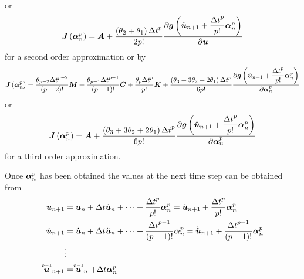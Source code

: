 or
\begin{equation}
  \fnof{\matr{J}}{\vectr{\alpha}^{p}_{n}}=\matr{A}+\dfrac{\pbrac{\theta_{2}+\theta_{1}}{\Delta
      t}^{p}}{2p!}
  \delby{\fnof{\vectr{g}}{\hat{\vectr{u}}_{n+1}+\dfrac{{\Delta t}^{p}}{p!}\vectr{\alpha}^{p}_{n}}}{\vectr{u}}
\end{equation}
for a second order approximation or by
\begin{equation}
  \fnof{\matr{J}}{\vectr{\alpha}^{p}_{n}}=\dfrac{\theta_{p-2}{\Delta
      t}^{p-2}}{\factorial{p-2}}\matr{M}+ \dfrac{\theta_{p-1}{\Delta
      t}^{p-1}}{\factorial{p-1}}\matr{C}+\dfrac{\theta_{p}{\Delta
      t}^{p}}{p!}\matr{K}+
  \dfrac{\pbrac{\theta_{3}+3\theta_{2}+2\theta_{1}}{\Delta t}^{p}}{6p!}
  \delby{\fnof{\vectr{g}}{\hat{\vectr{u}}_{n+1}+\dfrac{{\Delta t}^{p}}{p!}
      \vectr{\alpha}^{p}_{n}}}{\vectr{\alpha}^{p}_{n}}
\end{equation}
or
\begin{equation}
  \fnof{\matr{J}}{\vectr{\alpha}^{p}_{n}}=\matr{A}+\dfrac{\pbrac{\theta_{3}+3\theta_{2}+2\theta_{1}}{\Delta
      t}^{p}}{6p!}
  \delby{\fnof{\vectr{g}}{\hat{\vectr{u}}_{n+1}+\dfrac{{\Delta
          t}^{p}}{p!}\vectr{\alpha}^{p}_{n}}}{\vectr{\alpha}^{p}_{n}}
\end{equation}
for a third order approximation.

Once $ \boldsymbol{\alpha} ^{p}_{n}$ has been obtained the values at the next time step can be obtained from
\begin{equation}
  \begin{split}
     \boldsymbol{u} _{n+1} &=  \boldsymbol{u} _{n}+\Delta t
    \dot{ \boldsymbol{u} }_{n}+\cdots+\dfrac{{\Delta
        t}^{p}}{p!} \boldsymbol{\alpha} ^{p}_{n}=\hat{ \boldsymbol{u} }_{n+1}+
    \dfrac{{\Delta t}^{p}}{p!} \boldsymbol{\alpha} ^{p}_{n}\\
    \dot{ \boldsymbol{u} }_{n+1} &= \dot{ \boldsymbol{u} }_{n}+\Delta t
    \ddot{ \boldsymbol{u} }_{n}+\cdots+\dfrac{{\Delta
        t}^{p-1}}{\left( p-1 \right)!} \boldsymbol{\alpha} ^{p}_{n}=\dot{\hat{ \boldsymbol{u} }}_{n+1}+\dfrac{{\Delta
        t}^{p-1}}{\left( p-1 \right)!} \boldsymbol{\alpha} ^{p}_{n} \\
    &\vdots \\
     \stackrel{\scriptscriptstyle p-1}{ \boldsymbol{u} } _{n+1} &=  \stackrel{\scriptscriptstyle p-1}{ \boldsymbol{u} } _{n}+\Delta t \boldsymbol{\alpha} ^{p}_{n}
  \end{split}
\end{equation}

